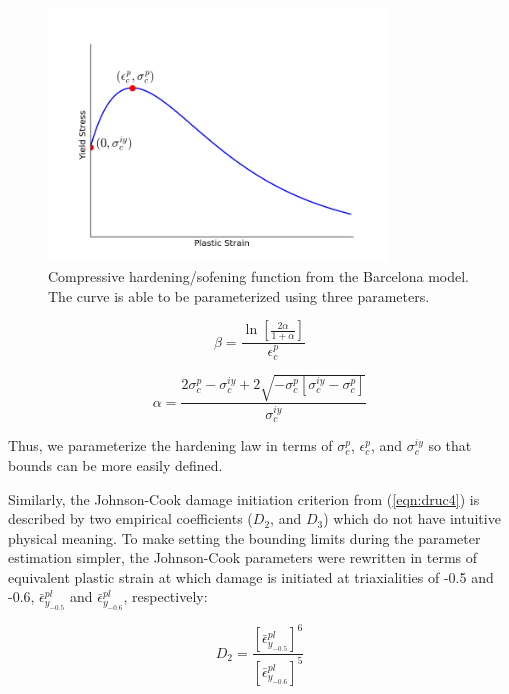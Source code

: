 \begin{figure}[!htb]
\begin{center}
\includegraphics[width=0.8\textwidth]{figures/Chapter3/BarcelonaCurve}
\caption{{\label{fig:barcelona}Compressive hardening/sofening function from the Barcelona model. The curve is able to be parameterized using three parameters.%
}}
\end{center}
\end{figure}

\begin{equation}
\beta=\frac{\ln\left[\frac{2\alpha}{1+\alpha} \right ]}{\epsilon_c^{p}}
\label{eqn:param2-2}
\end{equation}

\begin{equation}
\alpha =\frac{2\sigma_c^{p}-\sigma_c^{iy}+2\sqrt{-\sigma_c^p\left[\sigma_c^{iy}-\sigma_c^p \right ]}}{\sigma_c^{iy}}
\label{eqn:param2-3}
\end{equation}

Thus, we parameterize the hardening law in terms of $\sigma_{c}^{p}$, $\epsilon_c^{p}$, and  $\sigma_c^{iy}$ so that bounds can be more easily defined.

Similarly, the Johnson-Cook damage initiation criterion from (\ref{eqn:druc4}) is described by two empirical coefficients ($D_2$, and $D_3$) which do not have intuitive physical meaning. To make setting the bounding limits during the parameter estimation simpler, the Johnson-Cook parameters were rewritten in terms of equivalent plastic strain at which damage is initiated at triaxialities of -0.5 and -0.6, $\bar{\epsilon}^{pl}_{y_{-0.5}}$ and $\bar{\epsilon}^{pl}_{y_{-0.6}}$, respectively:

\begin{equation}
D_2=\frac{\left[\bar{\epsilon}^{pl}_{y_{-0.5}}\right]^6}{\left[\bar{\epsilon}^{pl}_{y_{-0.6}}\right]^5}
\label{eqn:dparam8}
\end{equation}

